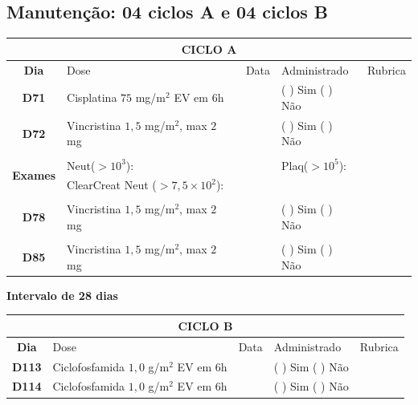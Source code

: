 \documentclass[11pt,a4paper,oldfontcommands]{memoir}
\begin{document}
\subsection{Manutenção: 04 ciclos A e 04 ciclos B}

\begin{center}
\begin{longtable}{p{1cm}p{6cm}|p{1cm}|p{3cm}|p{2.5cm}}
	\hline
	\multicolumn{5}{c}{\textbf{CICLO A}}\\
\hline
    \multicolumn{1}{c|}{\multirow{1}{*}{\textbf{Dia}}}&{Dose}&{Data}&{Administrado}&{Rubrica} \\
    \hline
    \multicolumn{1}{c|}{\multirow{1}{*}{\textbf{D71}}}&{Cisplatina \(75\) mg/m\(^2\) EV em 6h}&&{(  ) Sim (  ) Não}&\\
    \multicolumn{1}{c|}{\multirow{1}{*}{\textbf{D72}}}&{Vincristina \(1,5\) mg/m\(^2\), max \(2\) mg}&&{(  ) Sim (  ) Não}&\\
    \multicolumn{1}{c|}{\multirow{1}{*}{\textbf{}}}&&&&\\
    \hline
    \multicolumn{1}{c|}{\multirow{2}{*}{\textbf{Exames}}}&\multicolumn{2}{l|}{Neut(\(>10^3\)):}&{Plaq(\(>10^5\)):}&\\
    \cline{2-5}
    \multicolumn{1}{c|}{\multirow{2}{*}{{}}}&\multicolumn{2}{l|}{ClearCreat Neut (\(>7,5\times10^2\)):}&{}&{}\\
    \hline
    \\
    \hline
    \multicolumn{1}{c|}{\multirow{1}{*}{\textbf{D78}}}&{Vincristina \(1,5\) mg/m\(^2\), max \(2\) mg}&&{(  ) Sim (  ) Não}&\\
    \hline
    \\
    \hline
    \multicolumn{1}{c|}{\multirow{1}{*}{\textbf{D85}}}&{Vincristina \(1,5\) mg/m\(^2\), max \(2\) mg}&&{(  ) Sim (  ) Não}&\\
    \hline
    \end{longtable}
    \textbf{Intervalo de 28 dias}
    \begin{longtable}{p{1cm}p{6cm}|p{1cm}|p{3cm}|p{2.5cm}}
    \hline
	\multicolumn{5}{c}{\textbf{CICLO B}}\\
	\hline
    \multicolumn{1}{c|}{\multirow{1}{*}{\textbf{Dia}}}&{Dose}&{Data}&{Administrado}&{Rubrica} \\
    \hline
    \multicolumn{1}{c|}{\multirow{1}{*}{\textbf{D113}}}&{Ciclofosfamida \(1,0\) g/m\(^2\) EV em 6h}&&{(  ) Sim (  ) Não}&\\
    \multicolumn{1}{c|}{\multirow{1}{*}{\textbf{D114}}}&{Ciclofosfamida \(1,0\) g/m\(^2\) EV em 6h}&&{(  ) Sim (  ) Não}&\\

\end{longtable}
\end{center}
\end{document}
